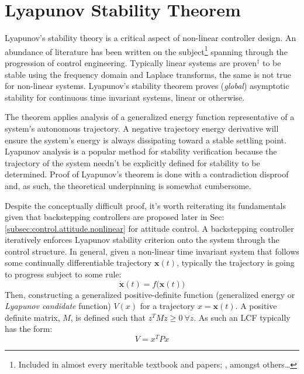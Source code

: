 \section{Lyapunov Stability Theorem}
\label{sec:control.lyapunov}
Lyapunov's stability theory is a critical aspect of non-linear controller design. An abundance of literature has been written on the subject\footnote{Included in almost every meritable textbook and papers; \cite{noteonlyapunov,nonlinearsystems}, amongst others\ldots} spanning through the progression of control engineering. Typically linear systems are proven$^\dagger$ to be stable using the frequency domain and Laplace transforms, the same is not true for non-linear systems. Lyapunov's stability theorem proves (\emph{global}) asymptotic stability for continuous time invariant systems, linear or otherwise.
\par
The theorem applies analysis of a generalized energy function representative of a system's autonomous trajectory. A negative trajectory energy derivative will ensure the system's energy is always dissipating toward a stable settling point. Lyapunov analysis is a popular method for stability verification because the trajectory of the system needn't be explicitly defined for stability to be determined. Proof of Lyapunov's theorem is done with a contradiction disproof and, as such, the theoretical underpinning is somewhat cumbersome.
\par
Despite the conceptually difficult proof, it's worth reiterating its fundamentals given that backstepping controllers are proposed later in Sec:\ref{subsec:control.attitude.nonlinear} for attitude control. A backstepping controller iteratively enforces Lyapunov stability criterion onto the system through the control structure. In general, given a non-linear time invariant system that follows some continually differentiable trajectory $\mathbf{x}(t)$, typically the trajectory is going to progress subject to some rule:
\begin{equation}
\dot{\mathbf{x}}(t)=f\big(\mathbf{x}(t)\big)
\end{equation}
Then, constructing a generalized positive-definite function (generalized energy or \emph{Lyapunov candidate} function) $V(x)$ for a trajectory $x=\mathbf{x}(t)$. A positive definite matrix, $M$, is defined such that $z^TMz\geq 0~\forall z$. As such an LCF typically has the form:
\begin{equation}
V=x^TPx
\end{equation}
